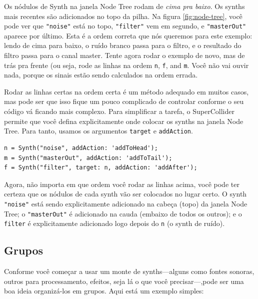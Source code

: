 Os nódulos de Synth na janela Node Tree rodam de \emph{cima pra baixo}. Os synths mais recentes são adicionados no topo da pilha. Na figura \ref{fig:node-tree}, você pode ver que \texttt{"noise"} está no topo, \texttt{"filter"} vem em segundo, e \texttt{"masterOut"} aparece por último. Esta é a ordem correta que nós queremos para este exemplo: lendo de cima para baixo, o ruído branco passa para o filtro, e o resultado do filtro passa para o canal master. Tente agora rodar o exemplo de novo, mas de trás pra frente (ou seja, rode as linhas na ordem \texttt{n}, \texttt{f}, and \texttt{m}. Você não vai ouvir nada, porque os sinais estão sendo calculados na ordem errada.

Rodar as linhas certas na ordem certa é um método adequado em muitos casos, mas pode ser que isso fique um pouco complicado de controlar conforme o seu código vá ficando mais complexo. Para simplificar a tarefa, o SuperCollider permite que você defina explicitamente onde colocar os synths na janela Node Tree. Para tanto, usamos os argumentos \texttt{target} e \texttt{addAction}.

\begin{lstlisting}[style=SuperCollider-IDE, basicstyle=\scttfamily\footnotesize]
n = Synth("noise", addAction: 'addToHead');
m = Synth("masterOut", addAction: 'addToTail');
f = Synth("filter", target: n, addAction: 'addAfter');
\end{lstlisting}

Agora, não importa em que ordem você rodar as linhas acima, você pode ter certeza que os nódulos de cada synth vão ser colocados no lugar certo. O synth \texttt{"noise"} está sendo explicitamente adicionado na cabeça (topo) da janela Node Tree; o \texttt{"masterOut"} é adicionado na cauda (embaixo de todos os outros); e o \texttt{filter} é explicitamente adicionado logo depois do \texttt{n} (o synth de ruído).

\subsection{Grupos}

Conforme você começar a usar um monte de synths---alguns como fontes sonoras, outros para processamento, efeitos, seja lá o que você precisar---,pode ser uma boa ideia organizá-los em grupos. Aqui está um exemplo simples:

